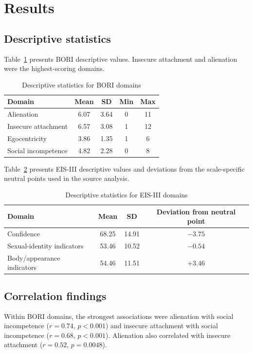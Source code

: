 \documentclass[12pt]{article}
\begin{document}
\section{Results}

\subsection{Descriptive statistics}
Table~\ref{tab:bori_desc} presents BORI descriptive values. Insecure attachment and alienation were the highest-scoring domains.

\begin{table}[htbp]
\centering
\caption{Descriptive statistics for BORI domains}
\label{tab:bori_desc}
\begin{tabular}{lcccc}
\toprule
Domain & Mean & SD & Min & Max \\
\midrule
Alienation & 6.07 & 3.64 & 0 & 11 \\
Insecure attachment & 6.57 & 3.08 & 1 & 12 \\
Egocentricity & 3.86 & 1.35 & 1 & 6 \\
Social incompetence & 4.82 & 2.28 & 0 & 8 \\
\bottomrule
\end{tabular}
\end{table}

Table~\ref{tab:eis_desc} presents EIS-III descriptive values and deviations from the scale-specific neutral points used in the source analysis.

\begin{table}[htbp]
\centering
\caption{Descriptive statistics for EIS-III domains}
\label{tab:eis_desc}
\begin{tabular}{lccc}
\toprule
Domain & Mean & SD & Deviation from neutral point \\
\midrule
Confidence & 68.25 & 14.91 & $-3.75$ \\
Sexual-identity indicators & 53.46 & 10.52 & $-0.54$ \\
Body/appearance indicators & 54.46 & 11.51 & $+3.46$ \\
\bottomrule
\end{tabular}
\end{table}

\subsection{Correlation findings}
Within BORI domains, the strongest associations were alienation with social incompetence ($r=0.74$, $p<0.001$) and insecure attachment with social incompetence ($r=0.68$, $p<0.001$). Alienation also correlated with insecure attachment ($r=0.52$, $p=0.0048$).
\end{document}
